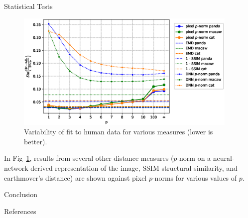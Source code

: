\documentclass[final,notheorems]{beamer}
\newlength{\sepwidth}
\newlength{\colwidth}
\newcommand{\separatorcolumn}{\begin{column}{\sepwidth}\end{column}}
\begin{document}
\begin{frame}[t]
\begin{columns}[t]
\begin{column}{\colwidth}
\begin{block}{Statistical Tests}
    \begin{figure}
      \centering
      \includegraphics{fig/best_p_approx2.eps}
      \caption{Variability of fit to human data for various measures (lower is better).}
      \label{fig:fit}
    \end{figure}


    In Fig~\ref{fig:fit}, results from several other distance measures ($p$-norm on a neural-network derived representation of the image, SSIM structural similarity, and earthmover's distance) are shown against pixel $p$-norms for various values of $p$.

  \end{block}

  \begin{alertblock}{Conclusion}

  \end{alertblock}

  \begin{block}{References}
    \footnotesize{\printbibliography}
  \end{block}

\end{column}

\separatorcolumn
\end{columns}
\end{frame}
\end{document}
